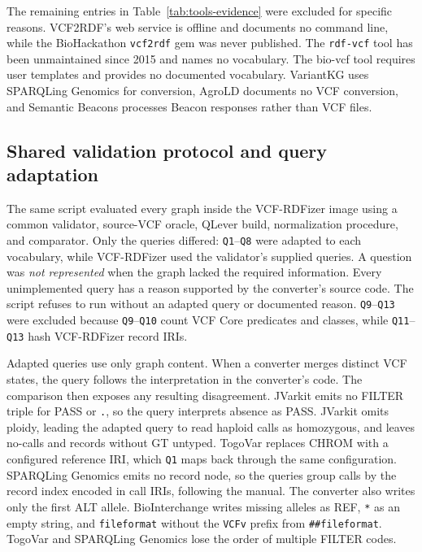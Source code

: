 \documentclass[11pt]{article}
\begin{document}
The remaining entries in Table~\ref{tab:tools-evidence} were excluded for specific reasons.
VCF2RDF's web service is offline and documents no command line, while the BioHackathon \texttt{vcf2rdf} gem was never published.
The \texttt{rdf-vcf} tool has been unmaintained since 2015 and names no vocabulary.
The bio-vcf tool requires user templates and provides no documented vocabulary.
VariantKG uses SPARQLing Genomics for conversion, AgroLD documents no VCF conversion, and Semantic Beacons processes Beacon responses rather than VCF files.

\subsection{Shared validation protocol and query adaptation}\label{subsec:converters-ports}
The same script evaluated every graph inside the VCF-RDFizer image using a common validator, source-VCF oracle, QLever build, normalization procedure, and comparator.
Only the queries differed: \texttt{Q1}--\texttt{Q8} were adapted to each vocabulary, while VCF-RDFizer used the validator's supplied queries.
A question was \emph{not represented} when the graph lacked the required information.
Every unimplemented query has a reason supported by the converter's source code.
The script refuses to run without an adapted query or documented reason.
\texttt{Q9}--\texttt{Q13} were excluded because \texttt{Q9}--\texttt{Q10} count VCF Core predicates and classes, while \texttt{Q11}--\texttt{Q13} hash VCF-RDFizer record IRIs.

Adapted queries use only graph content.
When a converter merges distinct VCF states, the query follows the interpretation in the converter's code.
The comparison then exposes any resulting disagreement.
JVarkit emits no FILTER triple for PASS or \texttt{.}, so the query interprets absence as PASS.
JVarkit omits ploidy, leading the adapted query to read haploid calls as homozygous, and leaves no-calls and records without GT untyped.
TogoVar replaces CHROM with a configured reference IRI, which \texttt{Q1} maps back through the same configuration.
SPARQLing Genomics emits no record node, so the queries group calls by the record index encoded in call IRIs, following the manual.
The converter also writes only the first ALT allele.
BioInterchange writes missing alleles as REF, \texttt{*} as an empty string, and \texttt{fileformat} without the \texttt{VCFv} prefix from \texttt{\#\#fileformat}.
TogoVar and SPARQLing Genomics lose the order of multiple FILTER codes.
\end{document}
